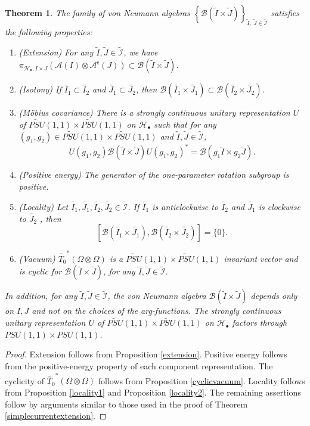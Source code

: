 \documentclass{article}
\newtheorem{theorem}{Theorem}
\newcommand{\hilb}{\mathcal{H}}
\newcommand{\B}{\mathcal{B}}
\newcommand{\A}{\mathcal{A}}
\begin{document}
\begin{theorem}\label{discreteLRconstruction}
    The family of  von Neumann algebras $\left\{ \B(\widetilde{I} \times \widetilde{J} )\right\}_{\widetilde{I},\ \widetilde{J} \in \widetilde{\mathcal{I}}}$  satisfies the following properties:  
    \begin{enumerate}
        \item (Extension) For any $\widetilde{I}, \widetilde{J} \in \widetilde{\mathcal{I}}$, 
        we have  $ \pi_{\hilb_\bullet, I \times J}(\A(I)\otimes\A^\mathfrak{r}(J)) \subset  \B(\widetilde{I}\times\widetilde{J})  $. 
        \item (Isotony) If $\widetilde{I_1} \subset \widetilde{I_2}$ and $\widetilde{J_1} \subset \widetilde{J_2}$, then $\B(\widetilde{I_1} \times \widetilde{J_1}) \subset \B(\widetilde{I_2} \times \widetilde{J_2})$.
        \item (M\"{o}bius covariance) There is a strongly continuous unitary representation $U$
of 
        $\widetilde{PSU}(1,1) \times \widetilde{PSU}(1,1) $ on $\hilb_\bullet$ such that for any $(g_1,g_2)\in \widetilde{PSU}(1,1)\times \widetilde{PSU}(1,1)$ and $\widetilde{I}, \widetilde{J}\in\widetilde{\mathcal{I}}$, 
        \[
        U(g_1, g_2) \B(\widetilde{I}\times \widetilde{J} ) U(g_1, g_2) ^* = \B(g_1\widetilde{I}\times g_2\widetilde{J} ).
        \]
        \item (Positive energy) The generator of the one-parameter rotation subgroup is positive.
        \item (Locality)  Let $\widetilde{I_1}, \widetilde{J_1}, \widetilde{I_2}, \widetilde{J_2}\in \widetilde{\mathcal{I}}$. If $\widetilde{I_1}$ is anticlockwise to  $\widetilde{I_2}$ and $\widetilde{J_1} $ is clockwise to $ \widetilde{J_2}$ , then  
    \[
   [ \B(\widetilde{I_1}\times\widetilde{J_1}), \B(\widetilde{I_2}\times\widetilde{J_2})    ] =\{0\}.
    \]
        \item (Vacuum) $\widetilde{T_0}^*(\Omega\otimes\Omega)$ is a $\widetilde{PSU}(1,1) \times \widetilde{PSU}(1,1)$ invariant vector and is cyclic for $\B(\widetilde{I}\times \widetilde{J} )$, for any  $\widetilde{I} , \widetilde{J} \in \widetilde{\mathcal{I}}.$
    \end{enumerate}
    In addition, for any $\widetilde{I}, \widetilde{J} \in\widetilde{\mathcal{I}}$, the von Neumann algebra $\B(\widetilde{I}\times\widetilde{J})$ depends only on $I, J$ and not on the choices of the arg-functions.  The strongly continuous unitary representation $U$ of $\widetilde{PSU}(1,1) \times \widetilde{PSU}(1,1) $ on $\hilb_\bullet$ factors through $PSU(1,1) \times PSU(1,1)$. 
\end{theorem}
\begin{proof}
Extension follows from Proposition \ref{extension}. 
    Positive energy follows from the positive-energy property of each component representation. The cyclicity of $\widetilde{T_0}^*(\Omega\otimes\Omega)$ follows from Proposition \ref{cyclicvacuum}. Locality follows from Proposition \ref{locality1} and Proposition \ref{locality2}.
    The remaining assertions follow by arguments similar to those used in the proof of Theorem \ref{simplecurrentextension}.
\end{proof}


\printbibliography[
heading=bibintoc,
title={References}
] %
\end{document}

